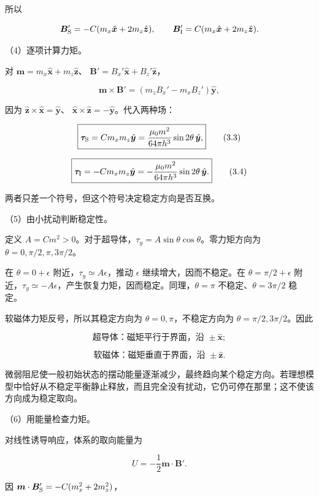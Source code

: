 \documentclass[12pt,a4paper,fontset=fandol]{ctexart}
\begin{document}
所以

\[
\boldsymbol B_{\rm S}'=-C(m_x\hat{\boldsymbol x}+2m_z\hat{\boldsymbol z}),
\qquad
\boldsymbol B_{\rm I}'=C(m_x\hat{\boldsymbol x}+2m_z\hat{\boldsymbol z}).
\]

（4）逐项计算力矩。

对 \(\boldsymbol m=m_x\hat{\boldsymbol x}+m_z\hat{\boldsymbol z}\)、
\(\boldsymbol B'=B_x'\hat{\boldsymbol x}+B_z'\hat{\boldsymbol z}\)，

\[
\boldsymbol m\times\boldsymbol B'
=(m_zB_x'-m_xB_z')\hat{\boldsymbol y},
\]

因为
\(\hat{\boldsymbol z}\times\hat{\boldsymbol x}=\hat{\boldsymbol y}\)、
\(\hat{\boldsymbol x}\times\hat{\boldsymbol z}=-\hat{\boldsymbol y}\)。代入两种场：

\[
\boxed{\boldsymbol\tau_{\rm S}
=Cm_xm_z\hat{\boldsymbol y}
=\frac{\mu_0m^2}{64\pi h^3}\sin2\theta\,\hat{\boldsymbol y},}
\tag{3.3}
\]

\[
\boxed{\boldsymbol\tau_{\rm I}
=-Cm_xm_z\hat{\boldsymbol y}
=-\frac{\mu_0m^2}{64\pi h^3}\sin2\theta\,\hat{\boldsymbol y}.}
\tag{3.4}
\]

两者只差一个符号，但这个符号决定稳定方向是否互换。

（5）由小扰动判断稳定性。

定义
\(A=Cm^2>0\)。对于超导体，\(\tau_y=A\sin\theta\cos\theta\)。零力矩方向为
\(\theta=0,\pi/2,\pi,3\pi/2\)。

在 \(\theta=0+\epsilon\) 附近，\(\tau_y\simeq A\epsilon\)，推动
\(\epsilon\) 继续增大，因而不稳定。在 \(\theta=\pi/2+\epsilon\)
附近，\(\tau_y\simeq-A\epsilon\)，产生恢复力矩，因而稳定。同理，\(\theta=\pi\)
不稳定、\(\theta=3\pi/2\) 稳定。

软磁体力矩反号，所以其稳定方向为 \(\theta=0,\pi\)，不稳定方向为
\(\theta=\pi/2,3\pi/2\)。因此

\[
\boxed{\text{超导体：磁矩平行于界面，沿 }\pm\hat{\boldsymbol x};}
\]

\[
\boxed{\text{软磁体：磁矩垂直于界面，沿 }\pm\hat{\boldsymbol z}.}
\]

微弱阻尼使一般初始状态的摆动能量逐渐减少，最终趋向某个稳定方向。若理想模型中恰好从不稳定平衡静止释放，而且完全没有扰动，它仍可停在那里；这不使该方向成为稳定取向。

（6）用能量检查力矩。

对线性诱导响应，体系的取向能量为

\[
U=-\frac12\boldsymbol m\cdot\boldsymbol B'.
\]

因 \(\boldsymbol m\cdot\boldsymbol B_{\rm S}'=-C(m_x^2+2m_z^2)\)，
\end{document}
